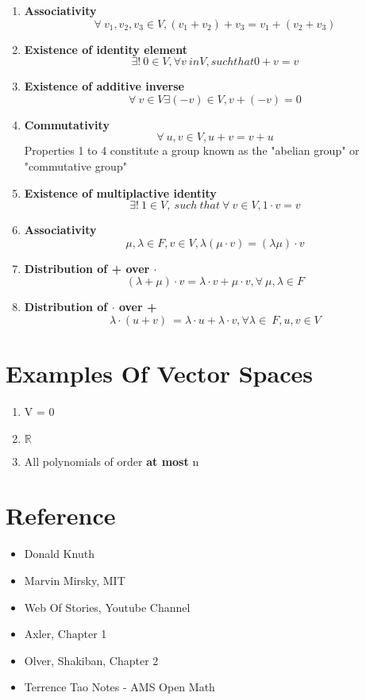 \documentclass{report}
\begin{document}
\begin{enumerate}
    \item \textbf{Associativity}
    \[\forall \ v_1, v_2,v_3 \in V, (v_1 + v_2) + v_3 = v_1 + (v_2 + v_3)\]
    \item \textbf{Existence of identity element}
    \[\exists! \ 0 \in V, \forall v\ in V, such that 0 + v = v\]
    \item \textbf{Existence of additive inverse}
    \[\forall \ v \in V \exists (-v) \in V, v + (-v) = 0\]
    \item \textbf{Commutativity}
    \[\forall \ u, v \in V, u+v = v+u \]
        Properties 1 to 4 constitute a group known as the "abelian group" or "commutative group"
    \item \textbf{Existence of multiplactive identity}
    \[\exists! \ 1 \in V, \ such \ that \ \forall \ v \in V, 1\cdot v = v\]
    \item \textbf{Associativity}
    \[\mu, \lambda \in F, v \in V, \lambda(\mu \cdot v) = (\lambda\mu)\cdot v\]
    \item \textbf{Distribution of + over $\cdot$}
    \[(\lambda + \mu) \cdot v = \lambda \cdot v + \mu \cdot v, \forall \ \mu, \lambda \in F\]
    \item \textbf{Distribution of $\cdot$ over +}
    \[\lambda \cdot(u + v)\ = \lambda \cdot u + \lambda \cdot v, \forall \lambda \in \ F, u,v \in V\]    
\end{enumerate}
\section{Examples Of Vector Spaces}
\begin{enumerate}
    \item V = {0}
    \item $\mathbb{R}$
    \item All polynomials of order \textbf{at most} n
\end{enumerate}
\section*{Reference}
    \begin{itemize}
        \item Donald Knuth
        \item Marvin Mirsky, MIT
        \item Web Of Stories, Youtube Channel
        \item Axler, Chapter 1
        \item Olver, Shakiban, Chapter 2
        \item Terrence Tao Notes - AMS Open Math
    \end{itemize}
\end{document}
